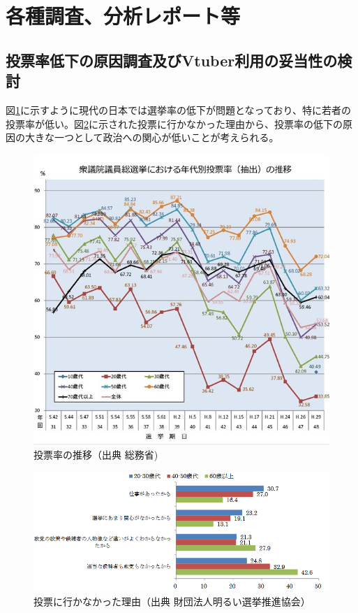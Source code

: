 \documentclass[a4paper,12pt]{jsarticle}
\begin{document}
\section{各種調査、分析レポート等}

\subsection{投票率低下の原因調査及びVtuber利用の妥当性の検討}

図\ref{fig:voterate}に示すように現代の日本では選挙率の低下が問題となっており、特に若者の投票率が低い。図\ref{fig:vote}に示された投票に行かなかった理由から、投票率の低下の原因の大きな一つとして政治への関心が低いことが考えられる。

\begin{figure}[H]
	\begin{center}
		\includegraphics[width=12.0cm]{fig/voterate.jpg}
		\caption{投票率の推移（出典 総務省\cite{vote1})}
		\label{fig:voterate}
	\end{center}
\end{figure}

\begin{figure}[H]
	\begin{center}
		\includegraphics[width=12.0cm]{fig/vote.png}
		\caption{投票に行かなかった理由（出典 財団法人明るい選挙推進協会\cite{vote2}）}
		\label{fig:vote}
	\end{center}
\end{figure}
\end{document}
